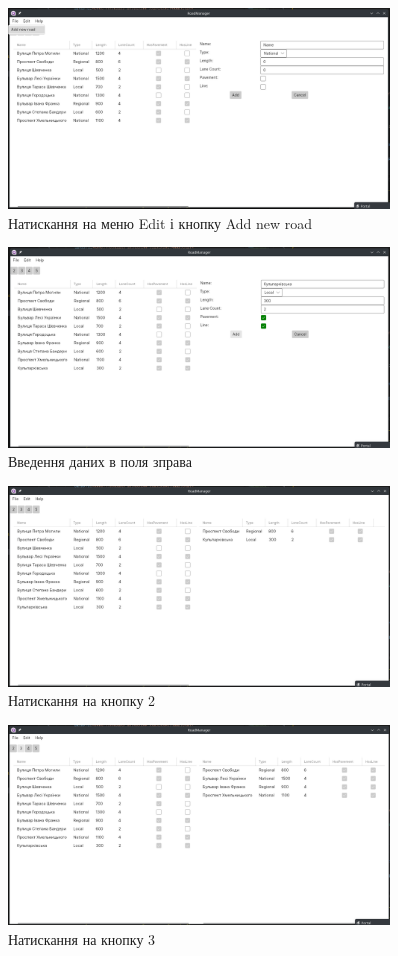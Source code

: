 \documentclass[14pt]{extarticle}
\begin{document}
\begin{figure}[H]
    \centering
    \includegraphics[width=0.90\textwidth]{add_road_click.png}
    \caption{Натискання на меню Edit і кнопку Add new road}
\end{figure}
\begin{figure}[H]
    \centering
    \includegraphics[width=0.90\textwidth]{add_road_result.png}
    \caption{Введення даних в поля зправа}
\end{figure}
\begin{figure}[H]
    \centering
    \includegraphics[width=0.90\textwidth]{second_task.png}
    \caption{Натискання на кнопку 2}
\end{figure}
\begin{figure}[H]
    \centering
    \includegraphics[width=0.90\textwidth]{task3.png}
    \caption{Натискання на кнопку 3}
\end{figure}
\end{document}
